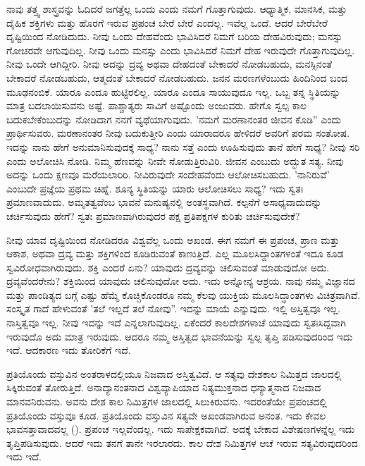 ನಾವು ತತ್ತ್ವ ಶಾಸ್ತ್ರವನ್ನು ಓದಿದರೆ ಜಗತ್ತೆಲ್ಲ ಒಂದು ಎಂದು ನಮಗೆ ಗೊತ್ತಾಗುವುದು. ಆಧ್ಯಾತ್ಮಿಕ, ಮಾನಸಿಕ, ಮತ್ತು ದೈಹಿಕ ಶಕ್ತಿಗಳು ಮತ್ತು ಹೊರಗೆ ಇರುವ ಪ್ರಪಂಚ ಬೇರೆ ಬೇರೆ ಎಂದಲ್ಲ. ಇವೆಲ್ಲ ಒಂದೆ. ಆದರೆ ಬೇರೆಬೇರೆ ದೃಷ್ಟಿಯಿಂದ ನೋಡಿದುದು. ನೀವು ಒಂದು ದೇಹವೆಂದು ಭಾವಿಸಿದರೆ ನಿಮಗೆ ಬರಿಯ ದೇಹವಿರುವುದು; ಮನಸ್ಸು ಗೋಚರವೇ ಆಗುವುದಿಲ್ಲ. ನೀವು ಒಂದು ಮನಸ್ಸು ಎಂದು ಭಾವಿಸಿದರೆ ನಿಮಗೆ ದೇಹ ಇರುವುದೇ ಗೊತ್ತಾಗುವುದಿಲ್ಲ. ನೀವು ಒಂದೇ ಆಗಿದ್ದೀರಿ. ನೀವು ಅದನ್ನು ದ್ರವ್ಯ ಅಥವಾ ದೇಹದಂತೆ ಬೇಕಾದರೆ ನೋಡಬಹುದು, ಮನಸ್ಸಿನಂತೆ ಬೇಕಾದರೆ ನೋಡಬಹುದು, ಆತ್ಮದಂತೆ ಬೇಕಾದರೆ ನೋಡಬಹುದು. ಜನನ ಮರಣಗಳೆಂಬುದು ಹಿಂದಿನಿಂದ ಬಂದ ಮೂಢನಂಬಿಕೆ. ಯಾರೂ ಎಂದೂ ಹುಟ್ಟಿರಲಿಲ್ಲ. ಯಾರೂ ಎಂದೂ ಸಾಯುವುದೂ ಇಲ್ಲ. ಒಬ್ಬ ತನ್ನ ಸ್ಥಿತಿಯನ್ನು ಮಾತ್ರ ಬದಲಾಯಿಸುವನು ಅಷ್ಟೆ. ಪಾಶ್ಚಾತ್ಯರು ಸಾವಿಗೆ ಅಷ್ಟೊಂದು ಅಂಜುವರು. ಹೇಗೊ ಸ್ವಲ್ಪ ಕಾಲ ಬದುಕಬೇಕೆಂಬುದನ್ನು ನೋಡಿದಾಗ ನನಗೆ ವ್ಯಥೆಯಾಗುವುದು. 'ನಮಗೆ ಮರಣಾನಂತರ ಜೀವನ ಕೊಡಿ'' ಎಂದು ಪ್ರಾರ್ಥಿಸುವರು. ಮರಣಾನಂತರ ನೀವು ಬದುಕುತ್ತೀರಿ ಎಂದು ಯಾರಾದರೂ ಹೇಳಿದರೆ ಅವರಿಗೆ ಪರಮ ಸಂತೋಷ. ಇದನ್ನು ನಾನು ಹೇಗೆ ಅನುಮಾನಿಸುವುದಕ್ಕೆ ಸಾಧ್ಯ? ನಾನು ಸತ್ತೆ ಎಂದು ಊಹಿಸುವುದು ತಾನೆ ಹೇಗೆ ಸಾಧ್ಯ? ನೀವು ಸರಿ ಎಂದು ಅಲೋಚಿಸಿ ನೋಡಿ. ನಿಮ್ಮ ಹೆಣವನ್ನು ನೀವೇ ನೋಡುತ್ತಿರುವಿರಿ. ಜೀವನ ಎಂಬುದು ಅದ್ಭುತ ಸತ್ಯ. ನೀವು ಅದನ್ನು ಒಂದು ಕ್ಷಣವೂ ಮರೆಯಲಾರಿರಿ. ನೀವಿರುವುದೇ ಸಂದೇಹವೆಂದು ಆಲೋಚಿಸಬಹುದು. 'ನಾನಿರುವೆ' ಎಂಬುದೇ ಪ್ರಜ್ಞೆಯ ಪ್ರಥಮ ಚಿಹ್ನೆ. ಶೂನ್ಯ ಸ್ಥಿತಿಯನ್ನು ಯಾರು ಆಲೋಚಿಸಲು ಸಾಧ್ಯ? ಇದು ಸ್ವತಃ ಪ್ರಮಾಣವಾದುದು. ಅಮೃತತ್ವವೆಂಬ ಭಾವನೆ ಮನುಷ್ಯನಲ್ಲಿ ಅಂತಸ್ಥವಾಗಿದೆ. ಕಲ್ಪನೆಗೆ ಅಸಾಧ್ಯವಾದುದನ್ನು ಚರ್ಚಿಸುವುದು ಹೇಗೆ? ಸ್ವತಃ ಪ್ರಮಾಣವಾಗಿರುವುದರ ಪಕ್ಷ ಪ್ರತಿಪಕ್ಷಗಳ ಕುರಿತು ಚರ್ಚಿಸುವುದೇಕೆ?

ನೀವು ಯಾವ ದೃಷ್ಟಿಯಿಂದ ನೋಡಿದರೂ ವಿಶ್ವವೆಲ್ಲ ಒಂದು ಅಖಂಡ. ಈಗ ನಮಗೆ ಈ ಪ್ರಪಂಚ, ಪ್ರಾಣ ಮತ್ತು ಆಕಾಶ, ಅಥವಾ ದ್ರವ್ಯ ಮತ್ತು ಶಕ್ತಿಗಳಿಂದ ಕೂಡಿರುವಂತೆ ಕಾಣುತ್ತಿದೆ. ಎಲ್ಲ ಮೂಲಸಿದ್ದಾಂತಗಳಂತೆ ಇದೂ ಕೂಡ ಸ್ವವಿರೋಧವಾಗಿರುವುದು. ಶಕ್ತಿ ಎಂದರೆ ಏನು? ಯಾವುದು ದ್ರವ್ಯವನ್ನು ಚಲಿಸುವಂತೆ ಮಾಡುವುದೋ ಅದು. ದ್ರವ್ಯವೆಂದರೇನು? ಶಕ್ತಿಯಿಂದ ಯಾವುದು ಚಲಿಸುವುದೋ ಅದು. ಇದು ಅನ್ನೋನ್ಯ ಆಶ್ರಯ. ನಾವು ನಮ್ಮ ವಿಜ್ಞಾನದ ಮತ್ತು ಪಾಂಡಿತ್ಯದ ಬಗ್ಗೆ ಎಷ್ಟು ಹೆಮ್ಮೆ ಕೊಚ್ಚಿಕೊಂಡರೂ ನಮ್ಮ ಕೆಲವು ಯುಕ್ತಿಯ ಮೂಲಸಿದ್ಧಾಂತಗಳು ವಿಚಿತ್ರವಾಗಿವೆ. ಸಂಸ್ಕೃತ ಗಾದೆ ಹೇಳುವಂತೆ 'ತಲೆ ಇಲ್ಲದೆ ತಲೆ ನೋವು”. ಇದನ್ನು ಮಾಯೆ ಎನ್ನುವುದು. ಇಲ್ಲಿ ಅಸ್ತಿತ್ವವೂ ಇಲ್ಲ. ನಾಸ್ತಿತ್ವವೂ ಇಲ್ಲ. ನೀವು ಇದನ್ನು ಇದೆ ಎನ್ನಲಾಗುವುದಿಲ್ಲ. ಏಕೆಂದರೆ ಕಾಲದೇಶಗಳಾಚೆ ಯಾವುದು ಸ್ವತಃಸಿದ್ದವಾಗಿ ಇರುವುದೊ ಅದು ಮಾತ್ರ ಇರುವುದು. ಆದರೂ ನಮ್ಮ ಅಸ್ತಿತ್ವದ ಭಾವನೆಯನ್ನು ಸ್ವಲ್ಪ ತೃಪ್ತಿ ಪಡಿಸುವುದರಿಂದ ಇದು ಇದೆ. ಆದಕಾರಣ ಇದು ತೋರಿಕೆಗೆ ಇದೆ.

ಪ್ರತಿಯೊಂದು ವಸ್ತುವಿನ ಅಂತರಾಳದಲ್ಲಿಯೂ ನಿಜವಾದ ಅಸ್ತಿತ್ವವಿದೆ. ಆ ಸತ್ಯವು ದೇಶಕಾಲ ನಿಮಿತ್ತದ ಜಾಲದಲ್ಲಿ ಸಿಕ್ಕಿರುವಂತೆ ತೋರುತ್ತಿದೆ. ಅನಾದ್ಯಾನಂತನಾದ ವಿಶ್ವವ್ಯಾಪಿಯಾದ ನಿತ್ಯಮುಕ್ತನಾದ ಧನ್ಯಾತ್ಮನಾದ ನಿಜವಾದ ಮಾನವನಿರುವನು. ಅವನು ದೇಶ ಕಾಲ ನಿಮಿತ್ತಗಳ ಜಾಲದಲ್ಲಿ ಸಿಲುಕಿರುವನು. ಇದರಂತೆಯೇ ಪ್ರಪಂಚದಲ್ಲಿ ಪ್ರತಿಯೊಂದು ವಸ್ತುವೂ ಕೂಡ. ಪ್ರತಿಯೊಂದು ವಸ್ತುವಿನ ಸತ್ಯವೇ ಅಖಂಡವಾಗಿರುವ ಅನಂತ. ಇದು ಕೇವಲ ಭಾವಸತ್ತಾವಾದವಲ್ಲ (). ಪ್ರಪಂಚ ಇಲ್ಲವೆಂದಲ್ಲ. ಇದು ಸಾಪೇಕ್ಷಕವಾಗಿದೆ. ಅದಕ್ಕೆ ಬೇಕಾದ ವಿಶೇಷಣಗಳನ್ನೆಲ್ಲ ಇದು ತೃಪ್ತಿಪಡಿಸುವುದು. ಆದರೆ ಇದು ತನಗೆ ತಾನೇ ಇರಲಾರದು. ಕಾಲ ದೇಶ ನಿಮಿತ್ತಗಳ ಆಚೆ ಇರುವ ಸತ್ಯವಿರುವುದರಿಂದ ಇದು ಇದೆ.

